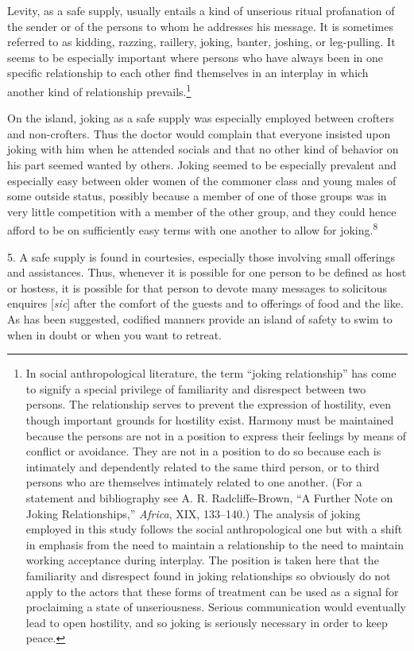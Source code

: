 \documentclass[twoside,symmetric,nobib,justified]{tufte-book}
\begin{document}
Levity, as a safe supply, usually entails a kind of unserious ritual
profanation of the sender or of the persons to whom he addresses his
message. It is sometimes referred to as kidding, razzing, raillery,
joking, banter, joshing, or leg-pulling. It seems to be especially
important where persons who have always been in one specific
relationship to each other find themselves in an interplay in which
another kind of relationship prevails.\footnote{In social
  anthropological literature, the term ``joking relationship'' has come
  to signify a special privilege of familiarity and disrespect between
  two persons. The relationship serves to prevent the expression of
  hostility, even though important grounds for hostility exist. Harmony
  must be maintained because the persons are not in a position to
  express their feelings by means of conflict or avoidance. They are not
  in a position to do so because each is intimately and dependently
  related to the same third person, or to third persons who are
  themselves intimately related to one another. (For a statement and
  bibliography see A. R. Radcliffe-Brown, ``A Further Note on Joking
  Relationships,'' \emph{Africa}, XIX, 133--140.) The analysis of joking
  employed in this study follows the social anthropological one but with
  a shift in emphasis from the need to maintain a relationship to the
  need to maintain working acceptance during interplay. The position is
  taken here that the familiarity and disrespect found in joking
  relationships so obviously do not apply to the actors that these forms
  of treatment can be used as a signal for proclaiming a state of
  unseriousness. Serious communication would eventually lead to open
  hostility, and so joking is seriously necessary in order to keep
  peace.}

On the island, joking as a safe supply was especially employed between
crofters and non-crofters. Thus the doctor would complain that everyone
insisted upon joking with him when he attended socials and that no other
kind of behavior on his part seemed wanted by others. Joking seemed to
be especially prevalent and especially easy between older women of the
commoner class and young males of some outside status, possibly because
a member of one of those groups was in very little competition with a
member of the other group, and they could hence afford to be on
sufficiently easy terms with one another to allow for joking.\textsuperscript{8}

5. A safe supply is found in courtesies, especially those involving
small offerings and assistances. Thus, whenever it is possible for one
person to be defined as host or hostess, it is possible for that person
to devote many messages to solicitous enquires {[}\emph{sic}{]} after the comfort of the
guests and to offerings of food and the like. As has been suggested,
codified manners provide an island of safety to swim to when in doubt or
when you want to retreat.
\end{document}
